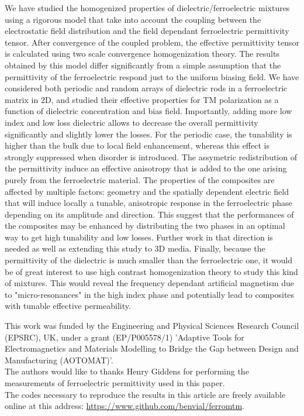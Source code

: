 \documentclass[%
 aip,
 amsmath,amssymb,
 reprint,%
linenumbers
]{revtex4-1}
\begin{document}
We have studied the homogenized properties of dielectric/ferroelectric mixtures
using a rigorous model that take into account the coupling between the electrostatic
field distribution and the field dependant ferroelectric permittivity tensor. After
convergence of the coupled problem, the effective permittivity tensor is calculated using
two scale convergence homogenization theory.
The results obtained by this model differ significantly from a simple assumption that
the permittivity of the ferroelectric respond just to the uniform biasing field.
We have considered both periodic and random arrays
of dielectric rods in a ferroelectric matrix in 2D, and studied their effective properties
for TM polarization as a function of dielectric concentration and bias field.
Importantly, adding more low index and low loss dielectric allows to decrease
the overall permittivity significantly and slightly lower the losses.
For the periodic case, the tunability is higher than the bulk due to local field enhancement, whereas
this effect is strongly suppressed when disorder is introduced. The assymetric redistribution of the permittivity
induce an effective anisotropy that is added to the one arising purely from the ferroelectric material.
The properties of the composites are affected by multiple factors:
geometry and the spatially dependent electric field that will induce locally a tunable, anisotropic
response in the ferroelectric phase depending on its amplitude and direction.
This suggest that the performances of the composites
may be enhanced by distributing the two phases in an optimal way to get high
tunability and low losses. Further work in that direction is needed as well as
extending this study to 3D media.
Finally, because the permittivity of the dielectric is much smaller than the ferroelectric one,
it would be of great interest to use high contrast homogenization theory
\cite{bouchitte_homogenization_2004, cherednichenko_homogenization_2015} to
study this kind of mixtures.
This would reveal the frequency dependant artificial magnetism due to "micro-resonances"
in the high index phase and potentially lead to composites with tunable effective permeability.



\begin{acknowledgments}
This work was funded by the Engineering and Physical Sciences Research
Council (EPSRC), UK, under a grant (EP/P005578/1) 'Adaptive Tools for
Electromagnetics and Materials Modelling to Bridge the Gap between
Design and Manufacturing (AOTOMAT)'.\\
The authors would like to thanks Henry Giddens for performing the
measurements of ferroelectric permittivity used in this paper.\\
%
The codes necessary to reproduce the results in this article are freely
available online at this address: \href{https://www.github.com/benvial/ferromtm}{https://www.github.com/benvial/ferromtm}.
\end{acknowledgments}
\end{document}
